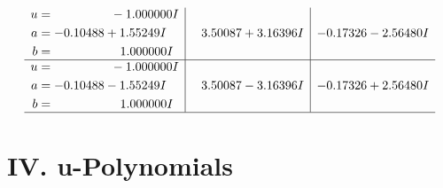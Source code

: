 \documentclass[1p]{elsarticle_modified}
\theoremstyle{definition}
\begin{document}
$$\begin{array}{c|c|c}
\begin{aligned}
u &= \phantom{-0.000000 } -1.000000 I \\
a &= -0.10488 + 1.55249 I \\
b &= \phantom{-0.000000 -}1.000000 I\end{aligned}
 & \phantom{-}3.50087 + 3.16396 I & -0.17326 - 2.56480 I \\ \hline\begin{aligned}
u &= \phantom{-0.000000 } -1.000000 I \\
a &= -0.10488 - 1.55249 I \\
b &= \phantom{-0.000000 -}1.000000 I\end{aligned}
 & \phantom{-}3.50087 - 3.16396 I & -0.17326 + 2.56480 I\\
 \hline 
 \end{array}$$\newpage
\newpage\renewcommand{\arraystretch}{1}
\centering \section*{ IV. u-Polynomials}
\end{document}
